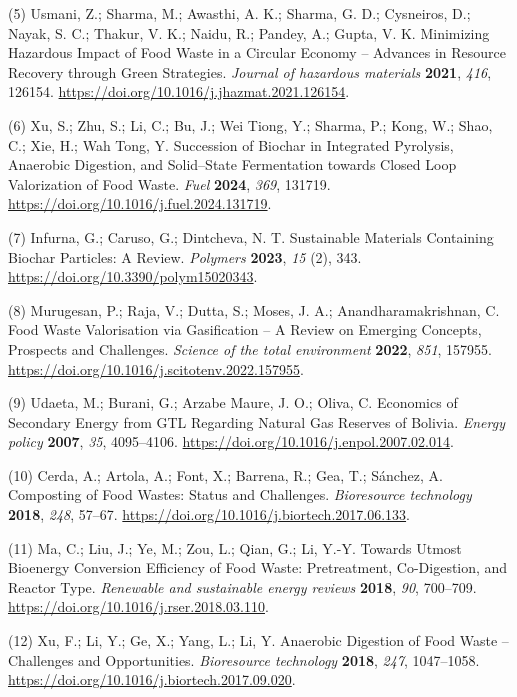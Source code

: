 \documentclass[11pt]{report}
\begin{document}
\hypertarget{citeproc_bib_item_5}{(5) Usmani, Z.; Sharma, M.; Awasthi, A. K.; Sharma, G. D.; Cysneiros, D.; Nayak, S. C.; Thakur, V. K.; Naidu, R.; Pandey, A.; Gupta, V. K. Minimizing Hazardous Impact of Food Waste in a Circular Economy – Advances in Resource Recovery through Green Strategies. \textit{Journal of hazardous materials} \textbf{2021}, \textit{416}, 126154. \url{https://doi.org/10.1016/j.jhazmat.2021.126154}.}

\hypertarget{citeproc_bib_item_6}{(6) Xu, S.; Zhu, S.; Li, C.; Bu, J.; Wei Tiong, Y.; Sharma, P.; Kong, W.; Shao, C.; Xie, H.; Wah Tong, Y. Succession of Biochar in Integrated Pyrolysis, Anaerobic Digestion, and Solid–State Fermentation towards Closed Loop Valorization of Food Waste. \textit{Fuel} \textbf{2024}, \textit{369}, 131719. \url{https://doi.org/10.1016/j.fuel.2024.131719}.}

\hypertarget{citeproc_bib_item_7}{(7) Infurna, G.; Caruso, G.; Dintcheva, N. T. Sustainable Materials Containing Biochar Particles: A Review. \textit{Polymers} \textbf{2023}, \textit{15} (2), 343. \url{https://doi.org/10.3390/polym15020343}.}

\hypertarget{citeproc_bib_item_8}{(8) Murugesan, P.; Raja, V.; Dutta, S.; Moses, J. A.; Anandharamakrishnan, C. Food Waste Valorisation via Gasification – A Review on Emerging Concepts, Prospects and Challenges. \textit{Science of the total environment} \textbf{2022}, \textit{851}, 157955. \url{https://doi.org/10.1016/j.scitotenv.2022.157955}.}

\hypertarget{citeproc_bib_item_9}{(9) Udaeta, M.; Burani, G.; Arzabe Maure, J. O.; Oliva, C. Economics of Secondary Energy from GTL Regarding Natural Gas Reserves of Bolivia. \textit{Energy policy} \textbf{2007}, \textit{35}, 4095–4106. \url{https://doi.org/10.1016/j.enpol.2007.02.014}.}

\hypertarget{citeproc_bib_item_10}{(10) Cerda, A.; Artola, A.; Font, X.; Barrena, R.; Gea, T.; Sánchez, A. Composting of Food Wastes: Status and Challenges. \textit{Bioresource technology} \textbf{2018}, \textit{248}, 57–67. \url{https://doi.org/10.1016/j.biortech.2017.06.133}.}

\hypertarget{citeproc_bib_item_11}{(11) Ma, C.; Liu, J.; Ye, M.; Zou, L.; Qian, G.; Li, Y.-Y. Towards Utmost Bioenergy Conversion Efficiency of Food Waste: Pretreatment, Co-Digestion, and Reactor Type. \textit{Renewable and sustainable energy reviews} \textbf{2018}, \textit{90}, 700–709. \url{https://doi.org/10.1016/j.rser.2018.03.110}.}

\hypertarget{citeproc_bib_item_12}{(12) Xu, F.; Li, Y.; Ge, X.; Yang, L.; Li, Y. Anaerobic Digestion of Food Waste – Challenges and Opportunities. \textit{Bioresource technology} \textbf{2018}, \textit{247}, 1047–1058. \url{https://doi.org/10.1016/j.biortech.2017.09.020}.}
\end{document}
